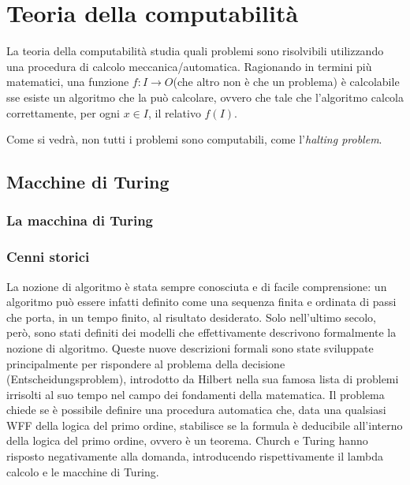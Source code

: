 \chapter{Teoria della computabilità}
La teoria della computabilità studia quali problemi sono risolvibili utilizzando una procedura di calcolo meccanica/automatica.
Ragionando in termini più matematici, una funzione $f: I \rightarrow O$(che altro non è che un problema) è calcolabile sse esiste un algoritmo che la può calcolare, ovvero che tale che l'algoritmo calcola correttamente, per ogni $x \in I$, il relativo $f(I)$.

Come si vedrà, non tutti i problemi sono computabili, come l'\textit{halting problem}.

\section{Macchine di Turing}
\subsection*{La macchina di Turing}
\subsection*{Cenni storici}
La nozione di algoritmo è stata sempre conosciuta e di facile comprensione: un algoritmo può essere infatti definito come una sequenza finita e ordinata di passi che porta, in un tempo finito, al risultato desiderato.
Solo nell'ultimo secolo, però, sono stati definiti dei modelli che effettivamente descrivono formalmente la nozione di algoritmo. Queste nuove descrizioni formali sono state sviluppate principalmente per rispondere al problema della decisione (Entscheidungsproblem), introdotto da Hilbert nella sua famosa lista di problemi irrisolti al suo tempo nel campo dei fondamenti della matematica. Il problema chiede se è possibile definire una procedura automatica che, data una qualsiasi WFF della logica del primo ordine, stabilisce se la formula è deducibile all'interno della logica del primo ordine, ovvero è un teorema. Church e Turing hanno risposto negativamente alla domanda, introducendo rispettivamente il lambda calcolo e le macchine di Turing.

